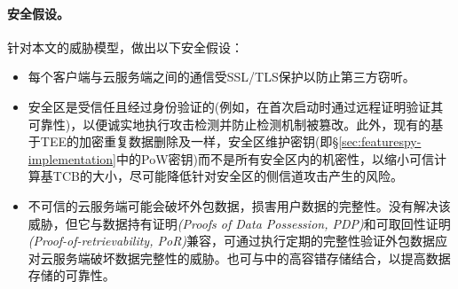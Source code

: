 \paragraph*{安全假设。}针对本文的威胁模型，做出以下安全假设：
\begin{itemize}[leftmargin=0em]
    \item 每个客户端与云服务端之间的通信受SSL/TLS保护以防止第三方窃听。
    \item 安全区是受信任且经过身份验证的(例如，在首次启动时通过远程证明验证其可靠性)，以便诚实地执行攻击检测并防止检测机制被篡改。此外，现有的基于TEE的加密重复数据删除\cite{shinde20}及\sysnameS 一样，安全区维护密钥(即\S\ref{sec:featurespy-implementation}中的PoW密钥)而不是所有安全区内的机密性，以缩小可信计算基TCB的大小，尽可能降低针对安全区的侧信道攻击产生的风险\cite{fei21}。
    \item 不可信的云服务端可能会破坏外包数据，损害用户数据的完整性。\sysnameF 没有解决该威胁，但它与数据持有证明\textit{(Proofs of Data Possession, PDP)}\cite{ateniese2007provable}和可取回性证明\textit{(Proof-of-retrievability, PoR)}\cite{juels2007pors}兼容，可通过执行定期的完整性验证外包数据应对云服务端破坏数据完整性的威胁。\sysnameF 也可与\cite{li15}中的高容错存储结合，以提高数据存储的可靠性。
\end{itemize}